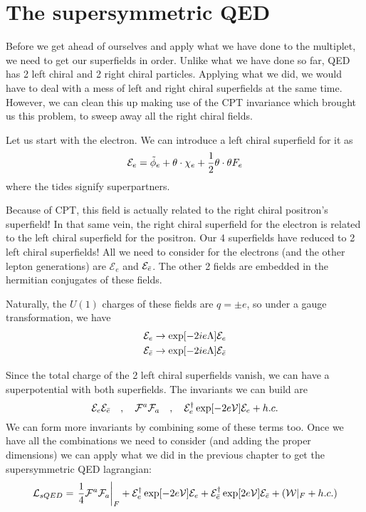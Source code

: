\section{The supersymmetric QED}
\label{ch:13:the supersymmetric QED}
Before we get ahead of ourselves and apply what we have done to the multiplet, we need to get our superfields in order. Unlike what we have done so far, QED has 2 left chiral and 2 right chiral particles. Applying what we did, we would have to deal with a mess of left and right chiral superfields at the same time. However, we can clean this up making use of the CPT invariance which brought us this problem, to sweep away all the right chiral fields. 

Let us start with the electron. We can introduce a left chiral superfield for it as 
\begin{equation}
    \mathcal{E}_e = \Tilde{\phi}_e + \theta \cdot \chi_e + \frac{1}{2} \theta \cdot \theta F_e
\end{equation}
where the tides signify superpartners.

Because of CPT, this field is actually related to the right chiral positron's superfield! In that same vein, the right chiral superfield for the electron is related to the left chiral superfield for the positron. Our 4 superfields have reduced to 2 left chiral superfields! All we need to consider for the electrons (and the other lepton generations) are $\mathcal{E}_e$ and $\mathcal{E}_{\Bar{e}}$. The other 2 fields are embedded in the hermitian conjugates of these fields.

Naturally, the $U(1)$ charges of these fields are $q = \pm e$, so under a gauge transformation, we have 
\begin{eqnarray}
    \mathcal{E}_e \rightarrow \exp[-2ie\Lambda] \mathcal{E}_e \nonumber \\
    \mathcal{E}_{\Bar{e}} \rightarrow \exp[-2ie\Lambda] \mathcal{E}_{\Bar{e}} \nonumber
\end{eqnarray}

Since the total charge of the 2 left chiral superfields vanish, we can have a superpotential with both superfields. The invariants we can build are
\begin{equation}
    \mathcal{E}_e \mathcal{E}_{\Bar{e}} \quad , \quad \mathcal{F}^a \mathcal{F}_a \quad , \quad \mathcal{E}_e^\dagger \exp[-2e\mathcal{V}] \mathcal{E}_e + h.c.
\end{equation}
We can form more invariants by combining some of these terms too. Once we have all the combinations we need to consider (and adding the proper dimensions) we can apply what we did in the previous chapter to get the supersymmetric QED lagrangian:
\begin{equation}
    \mathcal{L}_{sQED} = \left.\frac{1}{4} \mathcal{F}^a \mathcal{F}_a\right\vert_F + \mathcal{E}_e^\dagger \exp[-2e\mathcal{V}] \mathcal{E}_e + \mathcal{E}_{\Bar{e}}^\dagger \exp[2e\mathcal{V}]\mathcal{E}_{\Bar{e}} + (\mathcal{W}\vert_F + h.c.) 
\end{equation}

